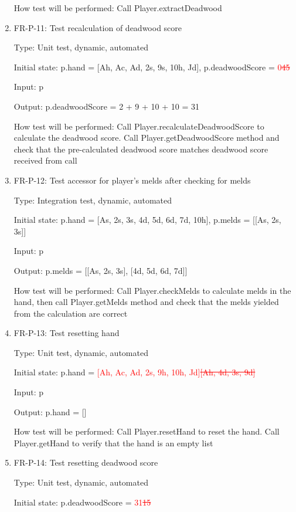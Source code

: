 \documentclass[12pt, titlepage]{article}
\begin{document}
\begin{enumerate}
    How test will be performed: Call Player.extractDeadwood
    
    \item{FR-P-11: Test recalculation of deadwood score}
    
    Type: Unit test, dynamic, automated
    					
    Initial state: p.hand = [Ah, Ac, Ad, 2s, 9s, 10h, Jd], p.deadwoodScore = \textcolor{red}{0\sout{45}}
    
    Input: p
    
    Output: p.deadwoodScore = 2 + 9 + 10 + 10 = 31
    
    How test will be performed: Call Player.recalculateDeadwoodScore to calculate the deadwood score. Call Player.getDeadwoodScore method and check that the pre-calculated deadwood score matches deadwood score received from call
    
    \item{FR-P-12: Test accessor for player's melds after checking for melds}
    
    Type: Integration test, dynamic, automated
    					
    Initial state: p.hand = [As, 2s, 3s, 4d, 5d, 6d, 7d, 10h], p.melds = [[As, 2s, 3s]]
    
    Input: p
    
    Output: p.melds = [[As, 2s, 3s], [4d, 5d, 6d, 7d]]
    
    How test will be performed: Call Player.checkMelds to calculate melds in the hand, then call Player.getMelds method and check that the melds yielded from the calculation are correct
    
    \item{FR-P-13: Test resetting hand}
    
    Type: Unit test, dynamic, automated	
    
    Initial state: p.hand = \textcolor{red}{[Ah, Ac, Ad, 2s, 9h, 10h, Jd]\sout{[Ah, 4d, 3s, 9d]}}
    
    Input: p
    
    Output: p.hand = []
    
    How test will be performed: Call Player.resetHand to reset the hand. Call Player.getHand to verify that the hand is an empty list
    
    \item{FR-P-14: Test resetting deadwood score}
    
    Type: Unit test, dynamic, automated	
    
    Initial state: p.deadwoodScore = \textcolor{red}{31\sout{15}}
    

\end{enumerate}
\end{document}
